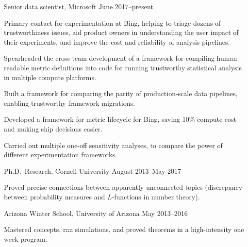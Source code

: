\documentclass[11pt, letterpaper]{awesome-cv}
\begin{document}
\begin{cventries}

\cventry
  {Senior data scientist, Microsoft}
  {}{}
  {June 2017--present}
  {
    \begin{cvitems}
      \item{Primary contact for experimentation at Bing, helping to triage dozens of trustworthiness issues, aid product owners in understanding the user impact of their experiments, and improve the cost and reliability of analysis pipelines.}
      \item{Spearheaded the cross-team development of a framework for compiling human-readable metric definitions into code for running trustworthy statistical analysis in multiple compute platforms.}
      \item{Built a framework for comparing the parity of production-scale data pipelines, enabling trustworthy framework migrations.}
      \item{Developed a framework for metric lifecycle for Bing, saving 10\% compute cost and making ship decisions easier.}
      \item{Carried out multiple one-off sensitivity analyses, to compare the power of different experimentation frameworks.}
    \end{cvitems}
  }

\cventry
  {Ph.D.~Research, Cornell University}
  {}{}
  {August 2013--May 2017}
  {
    \begin{cvitems}
      \item{Proved precise connections between apparently unconnected topics (discrepancy between probability measures and $L$-functions in number theory).}
    \end{cvitems}
  }

\cventry
  {Arizona Winter School, University of Arizona}
  {}{}
  {May 2013--2016}
  {
    \begin{cvitems}
      \item{Mastered concepts, ran simulations, and proved theorems in a high-intensity one week program.}
    \end{cvitems}
  }
\end{cventries}





\end{document}

